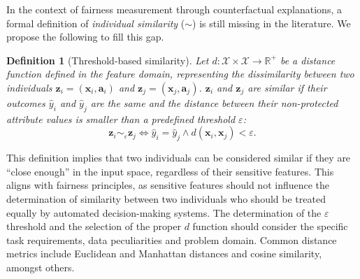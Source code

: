 \documentclass[letterpaper]{article} %
\newtheorem{definition}{Definition}
\begin{document}

In the context of fairness measurement through counterfactual explanations, a formal definition of \emph{individual similarity} ($\sim$) is still missing in the literature. We propose the following to fill this gap.
%
\begin{definition}[Threshold-based similarity]\label{similar_individuals}
	Let $d: \mathcal{X} \times \mathcal{X} \rightarrow \mathbb{R}^{+}$ be a distance function defined in the feature domain, representing the dissimilarity between two individuals $\boldsymbol{z}_i = (\boldsymbol{x}_i, \boldsymbol{a}_i)$ and $\boldsymbol{z}_j = (\boldsymbol{x}_j, \boldsymbol{a}_j)$.
	$\boldsymbol{z}_i$ and $\boldsymbol{z}_j$ are similar if their outcomes $\hat{y}_i$ and $\hat{y}_j$ are the same and the distance between their non-protected attribute values is smaller than a predefined threshold $\varepsilon$:
	$$ \boldsymbol{z}_i \sim_\varepsilon \boldsymbol{z}_j \iff \hat{y}_i = \hat{y}_j \wedge d(\boldsymbol{x}_i, \boldsymbol{x}_j) < \varepsilon. $$
\end{definition}
%
\noindent This definition implies that two individuals can be considered similar if they are ``close enough'' in the input space, regardless of their sensitive features. This aligns with fairness principles, as sensitive features should not influence the determination of similarity between two individuals who should be treated equally by automated decision-making systems.
%
The determination of the $\varepsilon$ threshold and the selection of the proper $d$ function should consider the specific task requirements, data peculiarities and problem domain. Common distance metrics include Euclidean and Manhattan distances and cosine similarity, amongst others.
\end{document}
